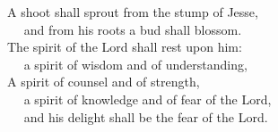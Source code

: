 
\lettrine{A}{} shoot shall sprout from the stump of Jesse,\\
   and from his roots a bud shall blossom.\\
The spirit of the Lord shall rest upon him:\\
   a spirit of wisdom and of understanding,\\
A spirit of counsel and of strength,\\
   a spirit of knowledge and of fear of the Lord,\\
   and his delight shall be the fear of the Lord.
